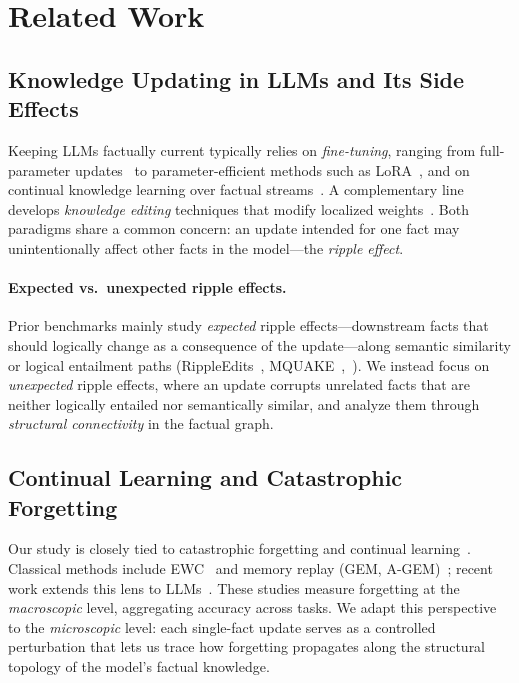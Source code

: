 \section{Related Work}

\subsection{Knowledge Updating in LLMs and Its Side Effects}

Keeping LLMs factually current typically relies on \emph{fine-tuning},
ranging from full-parameter updates~\cite{zhu2020modifying} to
parameter-efficient methods such as LoRA~\cite{hu2021lora}, and on
continual knowledge learning over factual
streams~\cite{jang2022continualknowledgelearninglanguage}. A
complementary line develops \emph{knowledge editing} techniques that
modify localized weights~\cite{meng2022rome, yao2023editing}. Both
paradigms share a common concern: an update intended for one fact may
unintentionally affect other facts in the model—the \emph{ripple
effect}.

\paragraph{Expected vs.\ unexpected ripple effects.}
Prior benchmarks mainly study \emph{expected} ripple
effects—downstream facts that should logically change as a consequence
of the update—along semantic similarity or logical entailment paths
(RippleEdits~\cite{cohen2023ripple},
MQUAKE~\cite{zhong2023mquake},~\citet{hua2024propagationpitfallsreasoningbasedassessment}).
We instead focus on \emph{unexpected} ripple effects, where an update
corrupts unrelated facts that are neither logically entailed nor
semantically similar, and analyze them through \emph{structural
connectivity} in the factual graph.

\subsection{Continual Learning and Catastrophic Forgetting}

Our study is closely tied to catastrophic forgetting and continual
learning~\cite{mccloskey1989catastrophic,
wang2024comprehensivesurveycontinuallearning}. Classical methods
include EWC~\cite{kirkpatrick2017overcoming} and memory replay (GEM,
A-GEM)~\cite{lopezpaz2022gradientepisodicmemorycontinual,
chaudhry2019efficientlifelonglearningagem}; recent work extends this
lens to LLMs~\cite{luo2025empiricalstudycatastrophicforgetting}.
These studies measure forgetting at the \emph{macroscopic} level,
aggregating accuracy across tasks. We adapt this perspective to the
\emph{microscopic} level: each single-fact update serves as a
controlled perturbation that lets us trace how forgetting propagates
along the structural topology of the model's factual knowledge.

